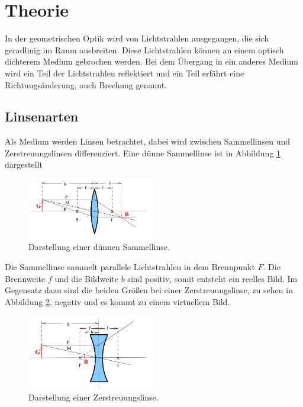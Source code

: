 \section{Theorie}
\label{sec:Theorie}
In der geometrischen Optik wird von Lichtstrahlen ausgegangen, die sich geradlinig im Raum ausbreiten.
Diese Lichtstrahlen können an einem optisch dichterem Medium gebrochen werden.
Bei dem Übergang in ein anderes Medium wird ein Teil der Lichtstrahlen reflektiert und ein Teil erfährt eine
Richtungsänderung, auch Brechung genannt.
\subsection{Linsenarten}
Als Medium werden Linsen betrachtet, dabei wird zwischen Sammellinsen und Zerstreuungslinsen
differenziert.
Eine dünne Sammellinse ist in Abbildung \ref{fig:duenn} dargestellt
\begin{figure}
 \centering
 \includegraphics[width=0.5\textwidth]{duenn.png}
 \caption{Darstellung einer dünnen Sammellinse.\cite{sample}}
 \label{fig:duenn}
 \end{figure}
Die Sammellinse sammelt parallele Lichtstrahlen in dem Brennpunkt $F$. Die Brennweite $f$ und die Bildweite $b$
sind positiv, somit entsteht ein reelles Bild. Im Gegensatz dazu sind die beiden Größen bei einer Zerstreuungslinse,
zu sehen in Abbildung \ref{fig:streu}, negativ und es kommt zu einem virtuellem Bild.
\begin{figure}
 \centering
 \includegraphics[width=0.5\textwidth]{streu.png}
 \caption{Darstellung einer Zerstreuungslinse.\cite{sample}}
 \label{fig:streu}
 \end{figure}
 \newpage
